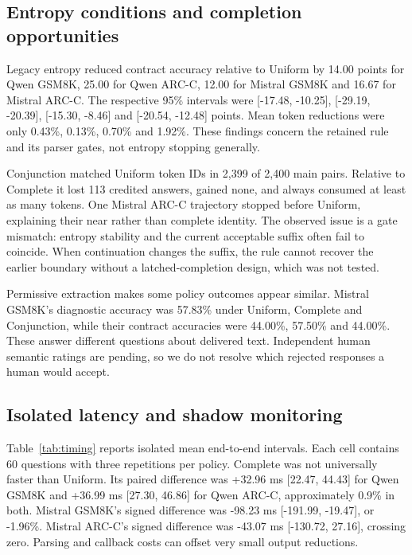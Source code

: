 \documentclass[12pt,a4paper]{article}
\begin{document}
\subsection{Entropy conditions and completion opportunities}
Legacy entropy reduced contract accuracy relative to Uniform by 14.00 points for Qwen GSM8K, 25.00 for Qwen ARC-C, 12.00 for Mistral GSM8K and 16.67 for Mistral ARC-C. The respective 95\% intervals were [-17.48, -10.25], [-29.19, -20.39], [-15.30, -8.46] and [-20.54, -12.48] points. Mean token reductions were only 0.43\%, 0.13\%, 0.70\% and 1.92\%. These findings concern the retained rule and its parser gates, not entropy stopping generally.

Conjunction matched Uniform token IDs in 2,399 of 2,400 main pairs. Relative to Complete it lost 113 credited answers, gained none, and always consumed at least as many tokens. One Mistral ARC-C trajectory stopped before Uniform, explaining their near rather than complete identity. The observed issue is a gate mismatch: entropy stability and the current acceptable suffix often fail to coincide. When continuation changes the suffix, the rule cannot recover the earlier boundary without a latched-completion design, which was not tested.

Permissive extraction makes some policy outcomes appear similar. Mistral GSM8K's diagnostic accuracy was 57.83\% under Uniform, Complete and Conjunction, while their contract accuracies were 44.00\%, 57.50\% and 44.00\%. These answer different questions about delivered text. Independent human semantic ratings are pending, so we do not resolve which rejected responses a human would accept.

\subsection{Isolated latency and shadow monitoring}
Table~\ref{tab:timing} reports isolated mean end-to-end intervals. Each cell contains 60 questions with three repetitions per policy. Complete was not universally faster than Uniform. Its paired difference was +32.96 ms [22.47, 44.43] for Qwen GSM8K and +36.99 ms [27.30, 46.86] for Qwen ARC-C, approximately 0.9\% in both. Mistral GSM8K's signed difference was -98.23 ms [-191.99, -19.47], or -1.96\%. Mistral ARC-C's signed difference was -43.07 ms [-130.72, 27.16], crossing zero. Parsing and callback costs can offset very small output reductions.
\end{document}

